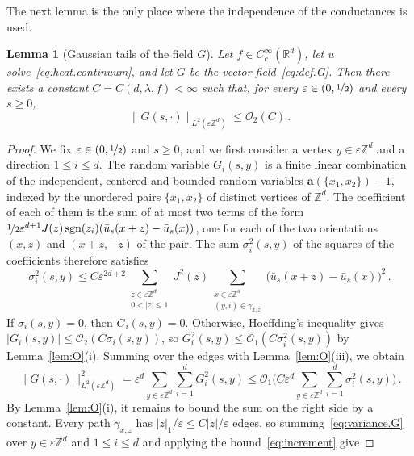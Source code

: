 \documentclass[11pt]{amsart}
\newtheorem{lemma}[theorem]{Lemma}
\numberwithin{equation}{section}
\newcommand{\Z}{\mathbb{Z}}
\newcommand{\R}{\mathbb{R}}
\newcommand{\ba}{\mathbf{a}}
\newcommand{\cO}{\mathcal{O}}
\newcommand{\eps}{\varepsilon}
\newcommand{\sgn}{\operatorname{sgn}}
\newcommand{\nf}{\nicefrac}
\begin{document}
The next lemma is the only place where the independence of the conductances is used.

\begin{lemma}[Gaussian tails of the field $G$] \label{lem:G}
Let $f \in C^\infty_c(\R^d)$, let $\bar u$ solve~\eqref{eq:heat.continuum}, and let $G$ be the vector field~\eqref{eq:def.G}.
Then there exists a constant $C = C(d, \lambda, f) < \infty$ such that, for every $\eps \in (0, \nf12)$ and every $s \geq 0$,
\begin{equation*}
    \|G(s, \cdot)\|_{L^2(\eps \Z^d)} \leq \cO_2(C)\,.
\end{equation*}
\end{lemma}

\begin{proof}
We fix $\eps \in (0, \nf12)$ and $s \geq 0$, and we first consider a vertex $y \in \eps \Z^d$ and a direction $1 \leq i \leq d$.
The random variable $G_i(s, y)$ is a finite linear combination of the independent, centered and bounded random variables $\ba(\{x_1, x_2\}) - 1$, indexed by the unordered pairs $\{x_1, x_2\}$ of distinct vertices of $\Z^d$.
The coefficient of each of them is the sum of at most two terms of the form $\nf12 \eps^{d+1} J(z) \sgn(z_i) (\bar u_s(x+z) - \bar u_s(x))$, one for each of the two orientations $(x,z)$ and $(x+z,-z)$ of the pair.
The sum $\sigma_i^2(s,y)$ of the squares of the coefficients therefore satisfies
\begin{equation} \label{eq:variance.G}
    \sigma_i^2(s,y) \leq C \eps^{2d+2} \sum_{\substack{z \in \eps \Z^d \\ 0 < |z| \leq 1}} J^2(z) \sum_{\substack{x \in \eps \Z^d \\ (y,i) \in \gamma_{x,z}}} \bigl( \bar u_s(x + z) - \bar u_s(x) \bigr)^2\,.
\end{equation}
If $\sigma_i(s,y) = 0$, then $G_i(s,y) = 0$.
Otherwise, Hoeffding's inequality gives $|G_i(s,y)| \leq \cO_2(C \sigma_i(s,y))$, so $G_i^2(s,y) \leq \cO_1(C \sigma_i^2(s,y))$ by Lemma~\ref{lem:O}(i).
Summing over the edges with Lemma~\ref{lem:O}(iii), we obtain
\begin{equation*}
    \|G(s, \cdot)\|_{L^2(\eps \Z^d)}^2 = \eps^d \sum_{y \in \eps \Z^d} \sum_{i=1}^d G_i^2(s,y) \leq \cO_1 \biggl( C \eps^d \sum_{y \in \eps \Z^d} \sum_{i=1}^d \sigma_i^2(s,y) \biggr)\,.
\end{equation*}
By Lemma~\ref{lem:O}(i), it remains to bound the sum on the right side by a constant.
Every path $\gamma_{x,z}$ has $|z|_1/\eps \leq C |z|/\eps$ edges, so summing~\eqref{eq:variance.G} over $y \in \eps \Z^d$ and $1 \leq i \leq d$ and applying the bound~\eqref{eq:increment} give

\end{proof}
\end{document}

